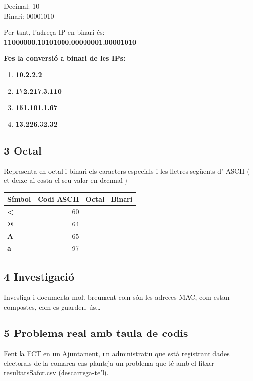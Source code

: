 \documentclass[
  12 pt,
  a4paper,
]{article}
\begin{document}
Decimal: 10\\
Binari: 00001010

Per tant, l'adreça IP en binari és:\\
\textbf{11000000.10101000.00000001.00001010}

\textbf{Fes la conversió a binari de les IPs:}

\begin{enumerate}
\def\labelenumi{\arabic{enumi}.}
\item
  \textbf{10.2.2.2}
\item
  \textbf{172.217.3.110}
\item
  \textbf{151.101.1.67}
\item
  \textbf{13.226.32.32}
\end{enumerate}

\subsection{3 Octal}\label{octal}

Representa en octal i binari els caracters especials i les lletres
següents d' ASCII ( et deixe al costa el seu valor en decimal )

\begin{longtable}[]{@{}lrll@{}}
\toprule\noalign{}
Símbol & Codi ASCII & Octal & Binari \\
\midrule\noalign{}
\endhead
\bottomrule\noalign{}
\endlastfoot
\textbf{\textless{}} & 60 & & \\
\textbf{@} & 64 & & \\
\textbf{A} & 65 & & \\
\textbf{a} & 97 & & \\
\end{longtable}

\subsection{4 Investigació}\label{investigaciuxf3}

Investiga i documenta molt breument com són les adreces MAC, com estan
compostes, com es guarden, ús\ldots{}

\subsection{5 Problema real amb taula de
codis}\label{problema-real-amb-taula-de-codis}

Fent la FCT en un Ajuntament, un administratiu que està registrant dades
electorals de la comarca ens planteja un problema que té amb el fitxer
\href{altres/resultatsSafor.csv}{resultatsSafor.csv} (descarrega-te'l).
\end{document}
